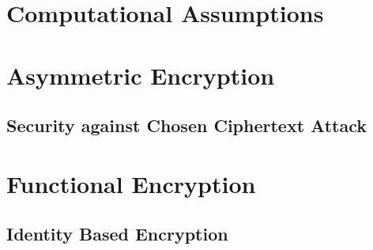 








\maketitle

\ifTableOfContents 
	\tableofcontents
	\newpage
\fi

\chapter{Computational Assumptions}

\chapter{Asymmetric Encryption}
	\section{Security against Chosen Ciphertext Attack}
	

\chapter{Functional Encryption}
	\section{Identity Based Encryption}
	





\appendix



